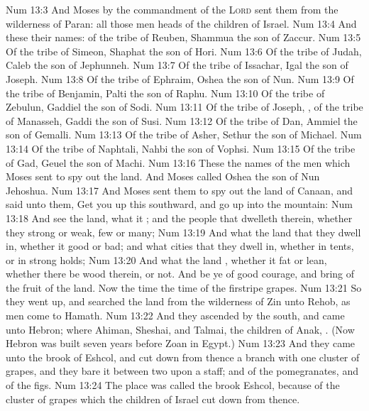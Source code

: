 \vs Num 13:3 And Moses by the commandment of the \textsc{Lord} sent them from the wilderness of Paran: all those men  heads of the children of Israel.
\vs Num 13:4 And these  their names: of the tribe of Reuben, Shammua the son of Zaccur.
\vs Num 13:5 Of the tribe of Simeon, Shaphat the son of Hori.
\vs Num 13:6 Of the tribe of Judah, Caleb the son of Jephunneh.
\vs Num 13:7 Of the tribe of Issachar, Igal the son of Joseph.
\vs Num 13:8 Of the tribe of Ephraim, Oshea the son of Nun.
\vs Num 13:9 Of the tribe of Benjamin, Palti the son of Raphu.
\vs Num 13:10 Of the tribe of Zebulun, Gaddiel the son of Sodi.
\vs Num 13:11 Of the tribe of Joseph, , of the tribe of Manasseh, Gaddi the son of Susi.
\vs Num 13:12 Of the tribe of Dan, Ammiel the son of Gemalli.
\vs Num 13:13 Of the tribe of Asher, Sethur the son of Michael.
\vs Num 13:14 Of the tribe of Naphtali, Nahbi the son of Vophsi.
\vs Num 13:15 Of the tribe of Gad, Geuel the son of Machi.
\vs Num 13:16 These  the names of the men which Moses sent to spy out the land. And Moses called Oshea the son of Nun Jehoshua.
\vs Num 13:17 And Moses sent them to spy out the land of Canaan, and said unto them, Get you up this  southward, and go up into the mountain:
\vs Num 13:18 And see the land, what it ; and the people that dwelleth therein, whether they  strong or weak, few or many;
\vs Num 13:19 And what the land  that they dwell in, whether it  good or bad; and what cities  that they dwell in, whether in tents, or in strong holds;
\vs Num 13:20 And what the land , whether it  fat or lean, whether there be wood therein, or not. And be ye of good courage, and bring of the fruit of the land. Now the time  the time of the firstripe grapes.
\vs Num 13:21 So they went up, and searched the land from the wilderness of Zin unto Rehob, as men come to Hamath.
\vs Num 13:22 And they ascended by the south, and came unto Hebron; where Ahiman, Sheshai, and Talmai, the children of Anak, . (Now Hebron was built seven years before Zoan in Egypt.)
\vs Num 13:23 And they came unto the brook of Eshcol, and cut down from thence a branch with one cluster of grapes, and they bare it between two upon a staff; and  of the pomegranates, and of the figs.
\vs Num 13:24 The place was called the brook Eshcol, because of the cluster of grapes which the children of Israel cut down from thence.
